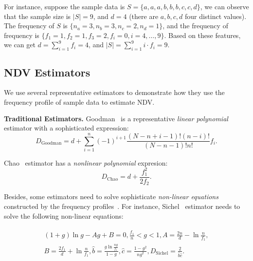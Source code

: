 For instance, suppose the sample data is $S=\{a, a, a, b, b, b, c, c, d\}$, we can observe that the sample size is $|S|=9$, and $d=4$ (there are $a,b,c,d$ four distinct values). The frequency of $S$ is $\{n_a=3,n_b=3,n_c=2,n_d=1\}$, and the frequency of frequency is $\{f_1=1,f_2=1,f_3=2,f_i=0,i=4,\ldots,9\}$. Based on these features, we can get $d=\sum_{i=1}^9f_i=4$, and $|S|=\sum_{i=1}^9i\cdot f_i=9$.

\subsection{NDV Estimators}
We use several representative estimators to demonstrate how they use the frequency profile of sample data to estimate NDV. 



\noindent\textbf{Traditional Estimators.}
Goodman~\cite{goodman1949estimation} is a representative \textit{linear polynomial} estimator with a sophisticated expression:
\begin{equation}
D_{\mathrm{Goodman}} =d+\sum_{i=1}^n(-1)^{i+1} \frac{(N-n+i-1) !(n-i) !}{(N-n-1) ! n !} f_i.
    \label{eq:goodman}
\end{equation}

Chao~\cite{chao1984nonparametric,chao_in_db_ozsoyoglu1991estimating} estimator has a \textit{nonlinear polynomial} expresion:
\begin{equation}
    D_{\mathrm{Chao}} = d + \frac{f_1^2}{2f_2}.
    \label{eq:chao}
\end{equation}

Besides, some estimators need to solve sophisticate \textit{non-linear equations} constructed by the frequency profiles~\cite{gee_charikar2000towards,sichel1986parameter,sichel1986word,sichel1992anatomy,mmo_bunge1993estimating}. For instance, Sichel~\cite{sichel1986parameter,sichel1986word,sichel1992anatomy} estimator needs to solve the following non-linear equations:


\begin{align}
    \begin{aligned}
        (1+g)\ln g-Ag+B=0,\frac{f_1}{n}<g<1, A=\frac{2n}{d}-\ln\frac{n}{f_1},\\
        B=\frac{2f_1}{d}+\ln \frac{n}{f_1},\hat{b}=\frac{g\ln \frac{ng}{f_1}}{1-g},\hat{c}=\frac{1-g^2}{ng^2},
        D_{\mathrm{Sichel}}=\frac{2}{\hat{b}\hat{c}}.\\
    \end{aligned}
    \label{eq:sichel}
\end{align}




